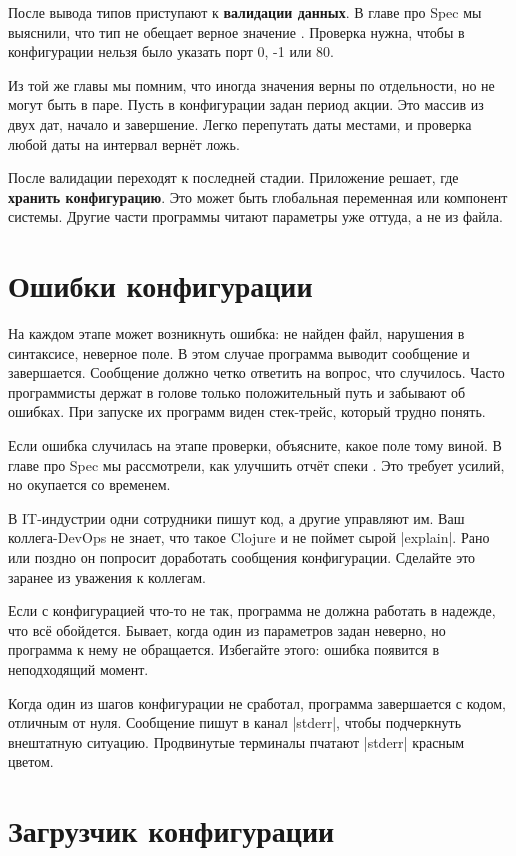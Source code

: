 После вывода типов приступают к \textbf{валидации данных}. В главе про Spec мы
выяснили, что тип не обещает верное значение .
Проверка нужна, чтобы в конфигурации нельзя было указать порт 0, -1 или 80.

Из той же главы мы помним, что иногда значения верны по отдельности, но не могут
быть в паре. Пусть в конфигурации задан период акции. Это массив из двух дат,
начало и завершение. Легко перепутать даты местами, и проверка любой даты
на интервал верн\"{е}т ложь.

После валидации переходят к последней стадии. Приложение решает, где
\textbf{хранить конфигурацию}. Это может быть глобальная переменная или
компонент системы. Другие части программы читают параметры уже оттуда, а не из
файла.

\section{Ошибки конфигурации}

На каждом этапе может возникнуть ошибка: не найден файл, нарушения в синтаксисе,
неверное поле. В этом случае программа выводит сообщение и завершается.
Сообщение должно четко ответить на вопрос, что случилось. Часто программисты
держат в голове только положительный путь и забывают об ошибках. При запуске
их программ виден стек-трейс, который трудно понять.

Если ошибка случилась на этапе проверки, объясните, какое поле тому виной. В
главе про Spec мы рассмотрели, как улучшить отч\"{е}т спеки .
Это требует усилий, но окупается со временем.

В IT-индустрии одни сотрудники пишут код, а другие управляют им. Ваш
коллега-DevOps не знает, что такое Clojure и не поймет сырой
\spverb|explain|. Рано или поздно он попросит доработать сообщения
конфигурации. Сделайте это заранее из уважения к коллегам.

Если с конфигурацией что-то не так, программа не должна работать в надежде, что
вс\"{е} обойдется. Бывает, когда один из параметров задан неверно, но программа к
нему не обращается. Избегайте этого: ошибка появится в неподходящий
момент.

Когда один из шагов конфигурации не сработал, программа завершается с кодом,
отличным от нуля. Сообщение пишут в канал \spverb|stderr|, чтобы подчеркнуть
внештатную ситуацию. Продвинутые терминалы пчатают \spverb|stderr| красным
цветом.

\section{Загрузчик конфигурации}

